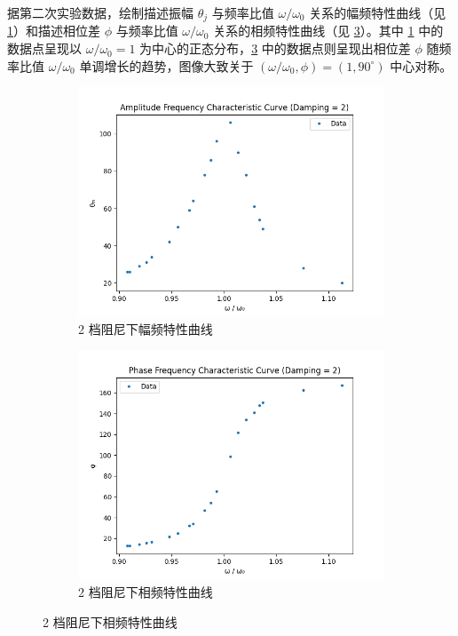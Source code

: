 \documentclass[12pt,a4paper]{amsart}
\begin{document}
据第二次实验数据，绘制描述振幅 $\theta_j$ 与频率比值 $\omega/\omega_0$ 关系的幅频特性曲线（见 \ref{fig:B_2}）和描述相位差 $\phi$ 与频率比值 $\omega/\omega_0$ 关系的相频特性曲线（见 \ref{fig:B_3}）。其中 \ref{fig:B_2} 中的数据点呈现以 $\omega/\omega_0 = 1$ 为中心的正态分布，\ref{fig:B_3} 中的数据点则呈现出相位差 $\phi$ 随频率比值 $\omega/\omega_0$ 单调增长的趋势，图像大致关于 $(\omega/\omega_0, \phi) = (1, 90^\circ)$ 中心对称。

\begin{figure}[H]
	\begin{subfigure}[b]{0.49\linewidth}
		\centering
		\includegraphics[width=\linewidth]{img/B_2.png}
		\caption{2 档阻尼下幅频特性曲线}
		\label{fig:B_2}
	\end{subfigure}
	\hfill
	\begin{subfigure}[b]{0.49\linewidth}
		\centering
		\includegraphics[width=\linewidth]{img/B_3.png}
		\caption{2 档阻尼下相频特性曲线}
		\label{fig:B_3}
	\end{subfigure}
\end{figure}
\end{document}
